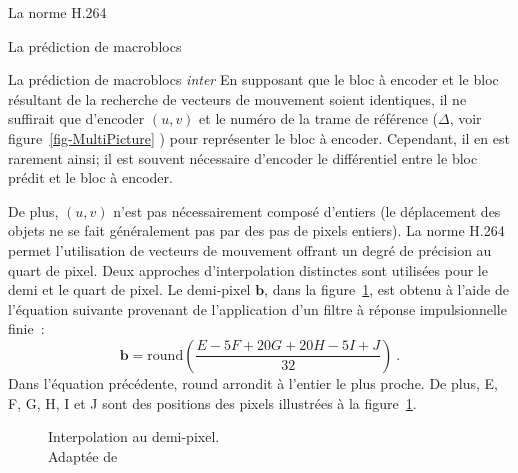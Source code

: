 \begin{chapter}{La norme H.264}
\begin{section}{La prédiction de macroblocs}
\begin{subsection}{La prédiction de macroblocs \textit{inter}}
En supposant que le bloc à encoder et le bloc résultant de la recherche de
vecteurs de mouvement soient identiques, il ne suffirait que d'encoder $(u,v)$
et le numéro de la trame de référence ($\Delta$, voir
figure~\ref{fig-MultiPicture} ) pour représenter le bloc
à encoder. Cependant, il en est rarement ainsi; il est souvent nécessaire
d'encoder le différentiel entre le bloc prédit et le bloc à encoder.

De plus, $(u,v)$ n'est pas nécessairement composé d'entiers (le déplacement des
objets ne se fait généralement pas par des pas de pixels entiers). La norme
H.264 permet l'utilisation de vecteurs de mouvement offrant un degré de
précision au quart de pixel. Deux approches d'interpolation distinctes sont
utilisées pour le demi et le quart de pixel. Le demi-pixel $\mathbf{b}$, dans la
figure~\ref{fig-HalfPel}, est obtenu à l'aide de l'équation suivante provenant
de l'application d'un filtre à réponse impulsionnelle finie~:
\begin{equation}
\mathbf{b} = \text{round} \left(\frac{E - 5F + 20G + 20H - 5I + J}{32}
\right)\:.
\label{eq-DemiPixel}
\end{equation}
Dans l'équation précédente, round arrondit à l'entier le plus proche. De
plus, E, F, G, H, I et J sont des positions des pixels illustrées à la
figure~\ref{fig-HalfPel}. 

\begin{figure}
\centering {}
\caption[Interpolation au demi-pixel]{Interpolation au demi-pixel. \\Adaptée de
\citet[p.~173]{richardson2003}}
\label{fig-HalfPel}
\end{figure}


\end{subsection}
\end{section}
\end{chapter}
